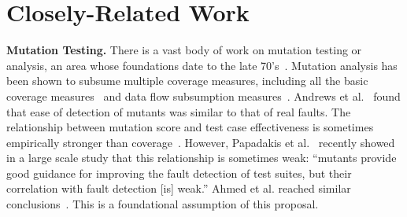 \section{Closely-Related Work}

\noindent\textbf{Mutation Testing.}
%
There is a vast body of work on mutation testing or analysis, an area whose foundations date
to the late 70's~\cite{demillo1978hints,budd1980theoretical}.  
%
Mutation analysis has been shown to subsume multiple coverage measures,
including all the basic coverage
measures~\cite{myer1979art,offutt1996subsumption} and data flow
subsumption measures~\cite{mathur1994empirical}.  
Andrews et al.~\cite{andrews2005mutation,andrews2006using} found that ease of detection
of mutants was similar to that of real faults.
The relationship between
mutation score and test case effectiveness is sometimes empirically stronger
than 
coverage~\cite{just2014mutants}. However, Papadakis et
al.~\cite{papadakis2018mutation} recently 
showed in a large scale study that this relationship is sometimes weak: ``mutants provide good guidance for improving the
fault detection of test suites, but their correlation with fault
detection [is] weak.''  Ahmed et al. reached similar
conclusions~\cite{ahmed_testedness}.  This is a foundational assumption of this proposal.  

